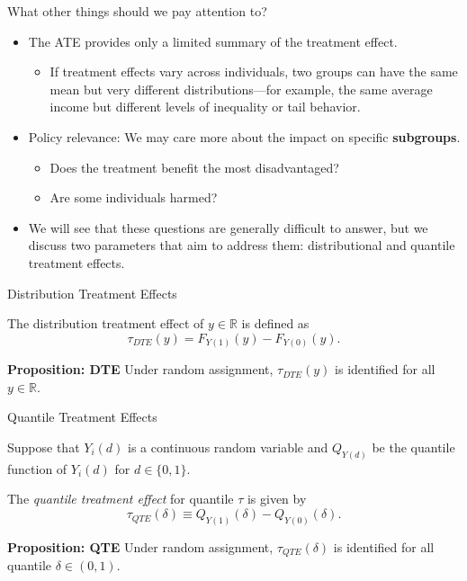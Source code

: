 \documentclass[11pt,aspectratio=169]{beamer}
\begin{document}
\begin{frame}{What other things should we pay attention to?}
\begin{itemize}
     
    \item The ATE provides only a limited summary of the treatment effect.
    \begin{itemize}
        \item If treatment effects vary across individuals, two groups can have the same mean but very different distributions—for example, the same average income but different levels of inequality or tail behavior.
    \end{itemize}
        \item Policy relevance: We may care more about the impact on specific \textbf{subgroups}.
    \begin{itemize}
        \item Does the treatment benefit the most disadvantaged?
        \item Are some individuals harmed?
    \end{itemize}
        \item We will see that these questions are generally difficult to answer, but we discuss two parameters that aim to address them: distributional and quantile treatment effects.
\end{itemize}


\end{frame}

\begin{frame}{Distribution Treatment Effects}

The distribution treatment effect of $y \in \mathbb{R}$ is defined as
$$\tau_{DTE}(y) = F_{Y(1)}(y) - F_{Y(0)}(y).$$

\textbf{Proposition: DTE}
Under random assignment, $\tau_{DTE}(y)$ is identified for all $y \in \mathbb{R}$.

\end{frame}


\begin{frame}{Quantile Treatment Effects}

Suppose that $Y_i(d)$ is a continuous random variable and $Q_{Y(d)}$ be the quantile function of $Y_i(d)$ for $d \in \{0, 1\}$.

The \emph{quantile treatment effect} for quantile $\tau$ is given by
$$\tau_{QTE}(\delta) \equiv Q_{Y(1)}(\delta) - Q_{Y(0)}(\delta).$$

\textbf{Proposition: QTE}
Under random assignment, $\tau_{QTE}(\delta)$ is identified for all quantile $\delta \in (0, 1)$.

\end{frame}
\end{document}
